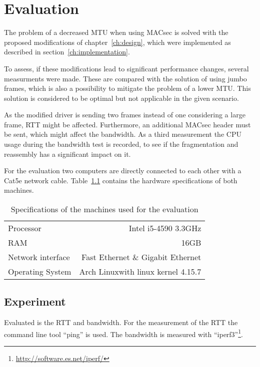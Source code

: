 \chapter{Evaluation}
\label{ch:eva}

The problem of a decreased \gls{MTU} when using \gls{MACsec} is solved with the proposed modifications of chapter~\ref{ch:design}, which were implemented as described in section~\ref{ch:implementation}.

To assess, if these modifications lead to significant performance changes, several measurments were made.
These are compared with the solution of using jumbo frames, which is also a possibility to mitigate the problem of a lower \gls{MTU}.
This solution is considered to be optimal but not applicable in the given scenario.

As the modified driver is sending two frames instead of one considering a large frame, \acrfull{RTT} might be affected.
Furthermore, an additional \gls{MACsec} header must be sent, which might affect the bandwidth.
As a third measurement the CPU usage during the bandwidth test is recorded, to see if the fragmentation and reassembly has a significant impact on it.

For the evaluation two computers are directly connected to each other with a Cat5e network cable.
Table~\ref{tab:eva-hardware} contains the hardware specifications of both machines.
\begin{table}[h]
  \centering
  \begin{tabular}{l  r}
    Processor & Intel i5-4590 3.3GHz\\
    RAM & 16GB\\
    Network interface & Fast Ethernet \& Gigabit Ethernet\\
    Operating System & Arch Linux\footnotemark with linux kernel 4.15.7\\
  \end{tabular}
  \caption{Specifications of the machines used for the evaluation}
  \label{tab:eva-hardware}
\end{table}

\section{Experiment}
Evaluated is the \gls{RTT} and bandwidth.
For the measurement of the \gls{RTT} the command line tool ``ping'' is used.
The bandwidth is measured with ``iperf3''\footnote{\url{http://software.es.net/iperf/}}.


